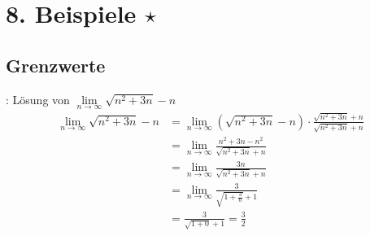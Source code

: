 \section{8. Beispiele \texorpdfstring{$\star$}{*}}

\subsection{Grenzwerte}
\Bsp {}: Lösung von $\lim\limits_{n\to\infty} \sqrt{n^2 + 3n} - n$
\begin{align*}
    \lim\limits_{n\to\infty} \sqrt{n^2 + 3n} - n &=\lim\limits_{n\to\infty} (\sqrt{n^2 + 3n} - n) \cdot \frac{\sqrt{n^2 + 3n} + n}{\sqrt{n^2 + 3n} + n} \\[-0.6em]
        &= \lim\limits_{n\to\infty} \frac{n^2 + 3n - n^2}{\sqrt{n^2 + 3n} + n} \\[-0.2em]
        &= \lim\limits_{n\to\infty} \frac{3n}{\sqrt{n^2 + 3n} + n} \\[-.3em]
        &= \lim\limits_{n\to\infty} \frac{3}{\sqrt{1 + \frac{3}{n}} + 1} \\[-.3em]
        &= \frac{3}{\sqrt{1 + 0} + 1} = \frac{3}{2}
\end{align*}

